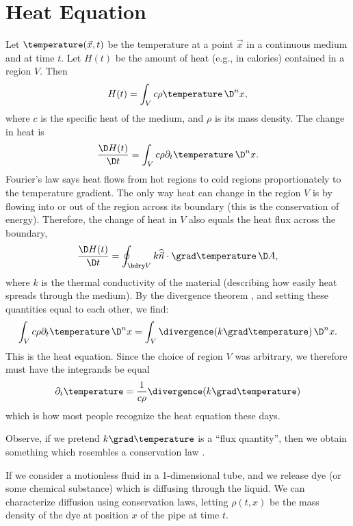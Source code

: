 \section{Heat Equation}

\begin{node}[Derivation]\label{pde:heat-0000}%
Let $\temperature(\vec{x},t)$ be the temperature at a point $\vec{x}$ in
a continuous medium and at time $t$. Let $H(t)$ be the amount of heat
(e.g., in calories) contained in a region $V$. Then
\begin{equation*}
H(t)=\int_{V}c\rho\temperature\,\D^{n}x,
\end{equation*}
where $c$ is the specific heat of the medium, and $\rho$ is its mass
density. The change in heat is
\begin{equation*}
\frac{\D H(t)}{\D t}=\int_{V}c\rho\partial_{t}\temperature\,\D^{n}x.
\end{equation*}
Fourier's law says heat flows from hot regions to cold regions
proportionately to the temperature gradient. The only way heat can
change in the region $V$ is by flowing into or out of the region across
its boundary (this is the conservation of energy). Therefore, the change
of heat in $V$ also equals the heat flux across the boundary,
\begin{equation*}
\frac{\D H(t)}{\D t}=\oint_{\bdry V}k\widehat{\vec{n}}\cdot\grad\temperature\,\D A,
\end{equation*}
where $k$ is the thermal conductivity of the material (describing how
easily heat spreads through the medium). By the divergence theorem ,
and setting these quantities equal to each other, we find:
\begin{equation}
\int_{V}c\rho\partial_{t}\temperature\,\D^{n}x=\int_{V}\divergence(k\grad\temperature)\,\D^{n}x.
\end{equation}
This is the heat equation. Since the choice of region $V$ was arbitrary,
we therefore must have the integrands be equal
\begin{equation}\label{eq:pde:heat:heat-equation}
\partial_{t}\temperature=\frac{1}{c\rho}\divergence(k\grad\temperature)
\end{equation}
which is how most people recognize the heat equation these days.

Observe, if we pretend $k\grad\temperature$ is a ``flux quantity'', then
we obtain something which resembles a conservation law .

\begin{node}[Diffusion]\label{pde:heat-0002}%
If we consider a motionless fluid in a 1-dimensional tube, and we
release dye (or some chemical substance) which is diffusing through the
liquid. We can characterize diffusion using conservation laws, letting
$\rho(t,x)$ be the mass density of the dye at position $x$ of the pipe
at time $t$.


\end{node}
\end{node}
